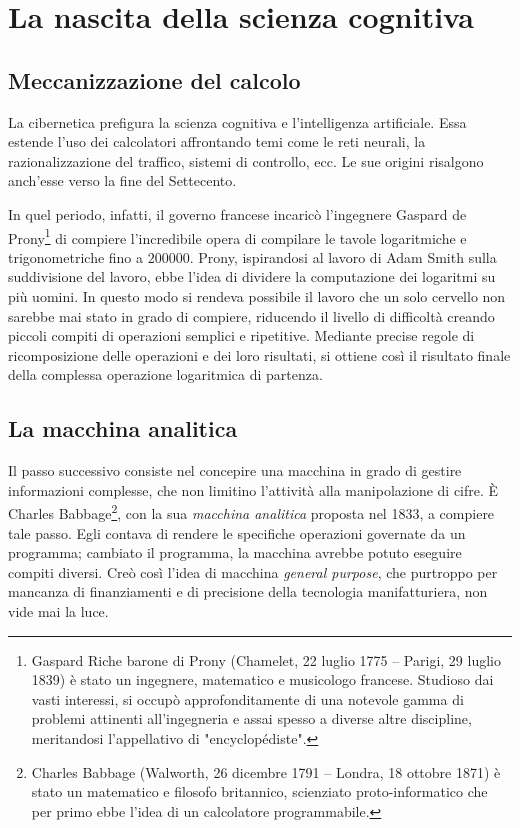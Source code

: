 \section{La nascita della scienza cognitiva}
\subsection{Meccanizzazione del calcolo}
La cibernetica prefigura la scienza cognitiva e l'intelligenza artificiale. Essa estende l'uso dei calcolatori affrontando temi come le reti neurali, la razionalizzazione del traffico, sistemi di controllo, ecc. Le sue origini risalgono anch'esse verso la fine del Settecento.

In quel periodo, infatti, il governo francese incaricò l'ingegnere Gaspard de Prony\footnote{Gaspard Riche barone di Prony (Chamelet, 22 luglio 1775 – Parigi, 29 luglio 1839) è stato un ingegnere, matematico e musicologo francese. Studioso dai vasti interessi, si occupò approfonditamente di una notevole gamma di problemi attinenti all'ingegneria e assai spesso a diverse altre discipline, meritandosi l'appellativo di "encyclopédiste".} di compiere l'incredibile opera di compilare le tavole logaritmiche e trigonometriche fino a $200000$. Prony, ispirandosi al lavoro di Adam Smith sulla suddivisione del lavoro, ebbe l'idea di dividere la computazione dei logaritmi su più uomini. In questo modo si rendeva possibile il lavoro che un solo cervello non sarebbe mai stato in grado di compiere, riducendo il livello di difficoltà creando piccoli compiti di operazioni semplici e ripetitive. Mediante precise regole di ricomposizione delle operazioni e dei loro risultati, si ottiene così il risultato finale della complessa operazione logaritmica di partenza.

\subsection{La macchina analitica}
Il passo successivo consiste nel concepire una macchina in grado di gestire informazioni complesse, che non limitino l'attività alla manipolazione di cifre. È Charles Babbage\footnote{Charles Babbage (Walworth, 26 dicembre 1791 – Londra, 18 ottobre 1871) è stato un matematico e filosofo britannico, scienziato proto-informatico che per primo ebbe l'idea di un calcolatore programmabile.}, con la sua \emph{macchina analitica} proposta nel 1833, a compiere tale passo. Egli contava di rendere le specifiche operazioni governate da un programma; cambiato il programma, la macchina avrebbe potuto eseguire compiti diversi. Creò così l'idea di macchina \emph{general purpose}, che purtroppo per mancanza di finanziamenti e di precisione della tecnologia manifatturiera, non vide mai la luce.

